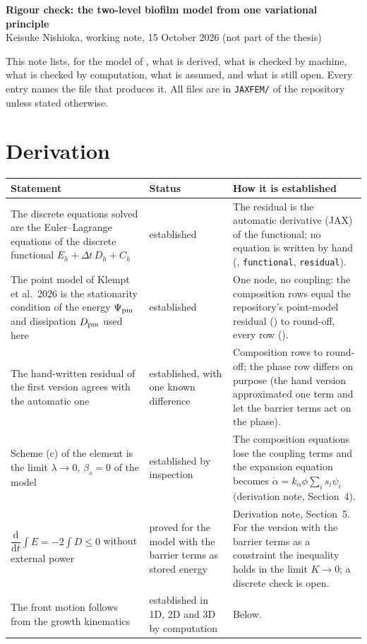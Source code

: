 \documentclass[11pt,a4paper]{article}
\begin{document}
\begin{center}
{\large\bfseries Rigour check: the two-level biofilm model from one variational principle}\\[3pt]
Keisuke Nishioka, working note, 15 October 2026 (not part of the thesis)
\end{center}

\noindent This note lists, for the model of , what is
derived, what is checked by machine, what is checked by computation, what is assumed, and
what is still open. Every entry names the file that produces it. All files are in
\texttt{JAXFEM/} of the repository unless stated otherwise.

\section{Derivation}

\small\begin{tabularx}{\linewidth}{@{}Yp{2.9cm}Y@{}}
\toprule
Statement & Status & How it is established\\
\midrule
The discrete equations solved are the Euler--Lagrange equations of the discrete functional
$E_h+\Delta t\,D_h+C_h$ & established & The residual is the automatic derivative (JAX) of the
functional; no equation is written by hand (,
\texttt{functional}, \texttt{residual}).\\
The point model of Klempt et al.\ 2026 is the stationarity condition of the energy
$\Psi_{\rm pm}$ and dissipation $D_{\rm pm}$ used here & established & One node, no coupling:
the composition rows equal the repository's point-model residual
() to round-off, every row
().\\
The hand-written residual of the first version agrees with the automatic one & established,
with one known difference & Composition rows to round-off; the phase row differs on purpose
(the hand version approximated one term and let the barrier terms act on the phase).\\
Scheme (c) of the element is the limit $\lambda\to0$, $\beta_s=0$ of the model & established
by inspection & The composition equations lose the coupling terms and the expansion equation
becomes $\dot\alpha=k_\alpha\phi\sum_i s_i\psi_i$ (derivation note, Section~4).\\
$\dfrac{\mathrm d}{\mathrm dt}\int E=-2\int D\le0$ without external power & proved for the
model with the barrier terms as stored energy & Derivation note, Section~5. For the version
with the barrier terms as a constraint the inequality holds in the limit $K\to0$; a discrete
check is open.\\
The front motion follows from the growth kinematics & established in 1D, 2D and 3D by
computation & Below.\\
\bottomrule
\end{tabularx}\normalsize
\end{document}
